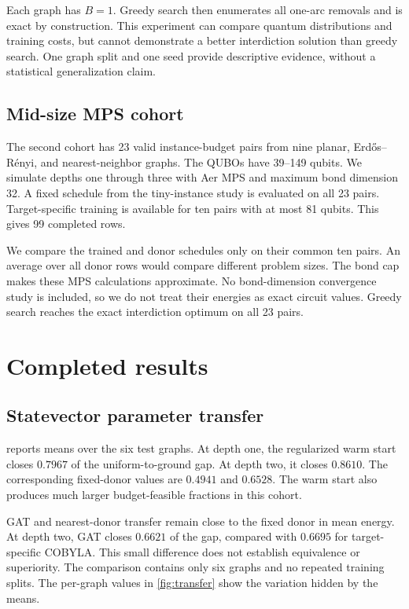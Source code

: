 \documentclass[review,onefignum,onetabnum]{siamart171218}
\begin{document}
Each graph has $B=1$.
Greedy search then enumerates all one-arc removals and is exact by construction.
This experiment can compare quantum distributions and training costs, but cannot demonstrate a better interdiction solution than greedy search.
One graph split and one seed provide descriptive evidence, without a statistical generalization claim.

\subsection{Mid-size MPS cohort}
The second cohort has 23 valid instance-budget pairs from nine planar, Erd\H{o}s--R\'enyi, and nearest-neighbor graphs.
The QUBOs have 39--149 qubits.
We simulate depths one through three with Aer MPS and maximum bond dimension 32.
A fixed schedule from the tiny-instance study is evaluated on all 23 pairs.
Target-specific training is available for ten pairs with at most 81 qubits.
This gives 99 completed rows.

We compare the trained and donor schedules only on their common ten pairs.
An average over all donor rows would compare different problem sizes.
The bond cap makes these MPS calculations approximate.
No bond-dimension convergence study is included, so we do not treat their energies as exact circuit values.
Greedy search reaches the exact interdiction optimum on all 23 pairs.

\section{Completed results}\label{sec:results}
\subsection{Statevector parameter transfer}
 reports means over the six test graphs.
At depth one, the regularized warm start closes $0.7967$ of the uniform-to-ground gap.
At depth two, it closes $0.8610$.
The corresponding fixed-donor values are $0.4941$ and $0.6528$.
The warm start also produces much larger budget-feasible fractions in this cohort.



GAT and nearest-donor transfer remain close to the fixed donor in mean energy.
At depth two, GAT closes $0.6621$ of the gap, compared with $0.6695$ for target-specific COBYLA.
This small difference does not establish equivalence or superiority.
The comparison contains only six graphs and no repeated training splits.
The per-graph values in \cref{fig:transfer} show the variation hidden by the means.
\end{document}
